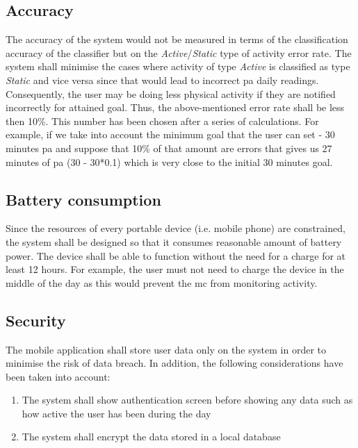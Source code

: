     \subsection{Accuracy}
    The accuracy of the system would not be measured in terms of the classification accuracy of the classifier but on the \textit{Active}/\textit{Static} type of activity error rate. The system shall minimise the cases where activity of type \textit{Active} is classified as type \textit{Static} and vice versa since that would lead to incorrect \gls{pa} daily readings. Consequently, the user may be doing less physical activity if they are notified incorrectly for attained goal. Thus, the above-mentioned error rate shall be less then 10\%. This number has been chosen after a series of calculations. For example, if we take into account the minimum goal that the user can set - 30 minutes \gls{pa} and suppose that 10\% of that amount are errors that gives us 27 minutes of \gls{pa} (30 - 30*0.1) which is very close to the initial 30 minutes goal.
    
    \subsection{Battery consumption}
    Since the resources of every portable device (i.e. mobile phone) are constrained, the system shall be designed so that it consumes reasonable amount of battery power. The device shall be able to function without the need for a charge for at least 12 hours. For example, the user must not need to charge the device in the middle of the day as this would prevent the \gls{mc} from monitoring activity.
    
    \subsection{Security}
    The mobile application shall store user data only on the system in order to minimise the risk of data breach. In addition, the following considerations have been taken into account:
    
    \begin{enumerate}
        \item The system shall show authentication screen before showing any data such as how active the user has been during the day
        \item The system shall encrypt the data stored in a local database
    \end{enumerate}
    
